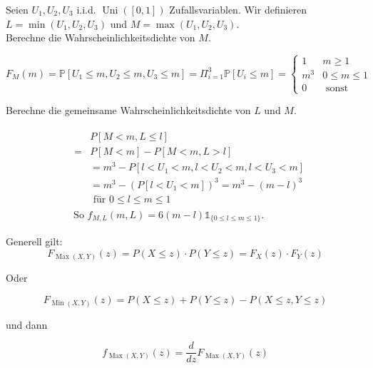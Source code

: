  Seien $U_1, U_2, U_3$ i.i.d. $\operatorname{Uni}([0,1])$ Zufallsvariablen. Wir definieren $L=\min \left(U_1, U_2, U_3\right)$ und $M=\max \left(U_1, U_2, U_3\right)$.\\
 
 Berechne die Wahrscheinlichkeitsdichte von $M$.
 
 $$
F_M(m)=\mathbb{P}\left[U_1 \leq m, U_2 \leq m, U_3 \leq m\right]=\Pi_{i=1}^3 \mathbb{P}\left[U_i \leq m\right]= \begin{cases}1 & m \geq 1 \\ m^3 & 0 \leq m \leq 1 \\ 0 & \text { sonst }\end{cases}
$$

Berechne die gemeinsame Wahrscheinlichkeitsdichte von $L$ und $M$.

$$
\begin{aligned}
&\begin{aligned}
&P[M<m, L \leq l]\\
= & P[M<m]-P[M<m, L>l] \\
& =m^3-P\left[l<U_1<m, l<U_2<m, l<U_3<m\right] \\
& =m^3-\left(P\left[l<U_1<m\right]\right)^3=m^3-(m-l)^3 
\\
&\text { für } 0 \leq l \leq m \leq 1
\end{aligned}\\
&\text { So } f_{M, L}(m, L)=6(m-l) \mathbb{1}_{\{0 \leq l \leq m \leq 1\}} \text {. }
\end{aligned}
$$

Generell gilt:
$$
F_{\operatorname{Max}(X, Y)}(z)=P(X \leq z) \cdot P(Y \leq z)=F_X(z) \cdot F_Y(z)
$$

Oder

$$
F_{\operatorname{Min}(X, Y)}(z)=P(X \leq z)+P(Y \leq z)-P(X \leq z, Y \leq z)
$$

und dann

$$
f_{\operatorname{Max}(X, Y)}(z)=\frac{d}{d z} F_{\operatorname{Max}(X, Y)}(z)
$$




